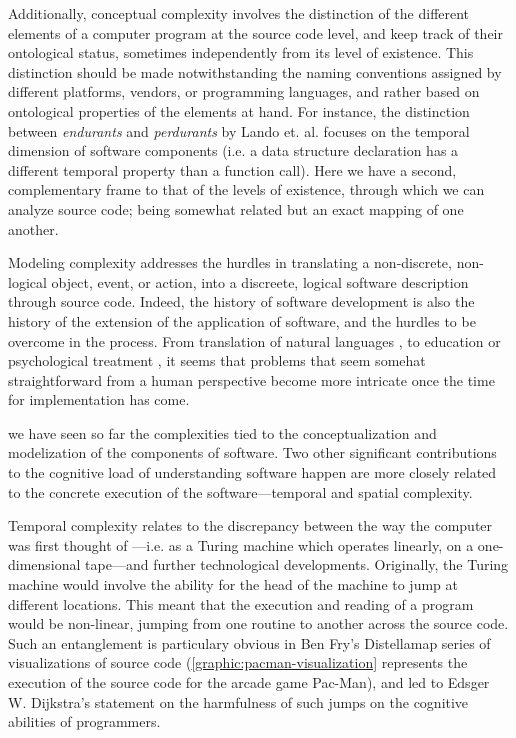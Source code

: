Additionally, conceptual complexity involves the distinction of the different elements of a computer program at the source code level, and keep track of their ontological status, sometimes independently from its level of existence. This distinction should be made notwithstanding the naming conventions assigned by different platforms, vendors, or programming languages, and rather based on ontological properties of the elements at hand. For instance, the distinction between \emph{endurants} and \emph{perdurants} by Lando et. al. focuses on the temporal dimension of software components (i.e. a data structure declaration has a different temporal property than a function call). Here we have a second, complementary frame to that of the levels of existence, through which we can analyze source code; being somewhat related but an exact mapping of one another.

Modeling complexity addresses the hurdles in translating a non-discrete, non-logical object, event, or action, into a discreete, logical software description through source code. Indeed, the history of software development is also the history of the extension of the application of software, and the hurdles to be overcome in the process. From translation of natural languages \citep{poibeau_machine_2017}, to education \citep{watters_teaching_2021} or psychological treatment \citep{weizenbaum_computer_1976}, it seems that problems that seem somehat straightforward from a human perspective become more intricate once the time for implementation has come.

we have seen so far the complexities tied to the conceptualization and modelization of the components of software. Two other significant contributions to the cognitive load of understanding software happen are more closely related to the concrete execution of the software—temporal and spatial complexity.

Temporal complexity relates to the discrepancy between the way the computer was first thought of —i.e. as a Turing machine which operates linearly, on a one-dimensional tape—and further technological developments. Originally, the Turing machine would involve the ability for the head of the machine to jump at different locations. This meant that the execution and reading of a program would be non-linear, jumping from one routine to another across the source code. Such an entanglement is particulary obvious in Ben Fry's Distellamap series of visualizations of source code (\ref{graphic:pacman-visualization} represents the execution of the source code for the arcade game Pac-Man), and led to Edsger W. Dijkstra's statement on the harmfulness of such jumps on the cognitive abilities of programmers.


